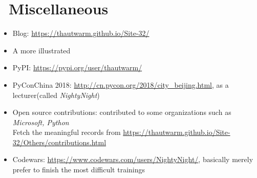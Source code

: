 \documentclass{resume}
\begin{document}
\section{\faInfo\ Miscellaneous}
\begin{itemize}[parsep=0.25ex]
  \item Blog: \url{https://thautwarm.github.io/Site-32/}
  \item A more illustrated 
  \item PyPI: \url{https://pypi.org/user/thautwarm/}
  \item PyConChina 2018: \url{http://cn.pycon.org/2018/city_beijing.html}, as a lecturer(called \textit{NightyNight}) 
  \item Open source contributions: contributed to some organizations such as \textit{Microsoft, Python} \\
        Fetch the meaningful records from \url{https://thautwarm.github.io/Site-32/Others/contributions.html}
  \item Codewars: \url{https://www.codewars.com/users/NightyNight/}, basically merely prefer to finish the most difficult trainings
\end{itemize}

%
%
\end{document}
